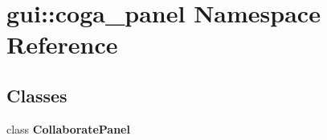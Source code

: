 \section{gui::coga\_\-panel Namespace Reference}
\label{namespacegui_1_1coga__panel}


\subsection*{Classes}
\begin{CompactItemize}
\item 
class {\bf CollaboratePanel}
\end{CompactItemize}
